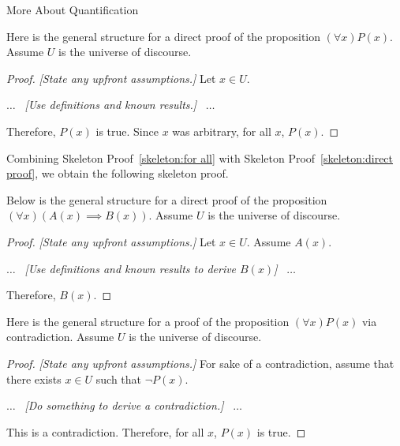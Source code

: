 \begin{section}{More About Quantification}
\begin{skeleton}\label{skeleton:for all}
Here is the general structure for a direct proof of the proposition $(\forall x)P(x)$. Assume $U$ is the universe of discourse.

\begin{mdframed}[style=skeleton]
\begin{proof}
\emph{[State any upfront assumptions.]} Let $x \in U$. 
\begin{center}
$\ldots$ \ \emph{[Use definitions and known results.]} \ $\ldots$\\
\end{center}
\noindent Therefore, $P(x)$ is true. Since $x$ was arbitrary, for all $x$, $P(x)$.
\end{proof}
\end{mdframed}
\end{skeleton}

Combining Skeleton Proof~\ref{skeleton:for all} with Skeleton Proof~\ref{skeleton:direct proof}, we obtain the following skeleton proof.

\begin{skeleton}\label{skeleton:for all direct proof}
Below is the general structure for a direct proof of the proposition $(\forall x)(A(x)\implies B(x))$. Assume $U$ is the universe of discourse.

\begin{mdframed}[style=skeleton]
\begin{proof}
\emph{[State any upfront assumptions.]} Let $x \in U$.  Assume $A(x)$.
\begin{center}
$\ldots$ \ \emph{[Use definitions and known results to derive $B(x)$]} \ $\ldots$\\
\end{center}
\noindent Therefore, $B(x)$.
\end{proof}
\end{mdframed}
\end{skeleton}

\begin{skeleton}
Here is the general structure for a proof of the proposition $(\forall x)P(x)$ via contradiction. Assume $U$ is the universe of discourse.

\begin{mdframed}[style=skeleton]
\begin{proof}
\emph{[State any upfront assumptions.]} For sake of a contradiction, assume that there exists $x\in U$ such that $\neg P(x)$. 
\begin{center}
$\ldots$ \ \emph{[Do something to derive a contradiction.]} \ $\ldots$\\
\end{center}
\noindent This is a contradiction. Therefore, for all $x$, $P(x)$ is true.
\end{proof}
\end{mdframed}
\end{skeleton}


\end{section}
